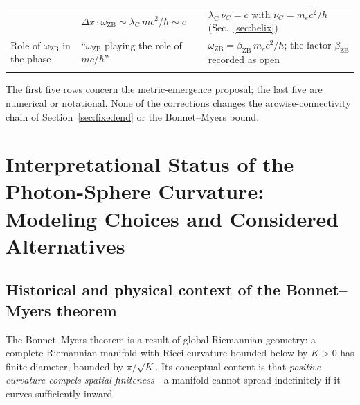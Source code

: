 \documentclass[%
 reprint, amsmath,amssymb, aps, prb, ]{revtex4-2}
\numberwithin{equation}{section}
\newcommand{\omZB}{\omega_{\text{ZB}}}
\newcommand{\lambdaC}{\lambda_{\mathrm{C}}}
\begin{document}
\begin{table}[t!]
\begin{tabular}{p{4.6cm}p{5.4cm}p{5.5cm}}
& $\Delta x\cdot\omZB \sim \lambdaC\,mc^2/\hbar \sim c$
& $\lambdaC\,\nu_C = c$ with $\nu_C = m_ec^2/h$ (Sec.~\ref{sec:helix}) \\
\addlinespace[0.3cm]
Role of $\omZB$ in the phase
& ``$\omZB$ playing the role of $mc/\hbar$''
& $\omZB = \beta_{\mathrm{ZB}}\,m_ec^2/\hbar$; the factor $\beta_{\mathrm{ZB}}$ recorded as open \\
\addlinespace[0.2cm]
\bottomrule
\end{tabular}
\vspace{0.2cm}
\begin{minipage}{0.95\textwidth}
\justifying\footnotesize
The first five rows concern the metric-emergence proposal; the last five are numerical or notational. None of the corrections changes the arcwise-connectivity chain of Section~\ref{sec:fixedend} or the Bonnet--Myers bound.
\end{minipage}
\end{table}

\section{Interpretational Status of the Photon-Sphere Curvature: Modeling Choices and Considered Alternatives}
\label{app:curvature_interpretation}

\subsection{Historical and physical context of the Bonnet--Myers theorem}
\label{app:bonnet_history}

The Bonnet--Myers theorem is a result of global Riemannian geometry: a complete Riemannian manifold with Ricci curvature bounded below by $K>0$ has finite diameter, bounded by $\pi/\sqrt{K}$. Its conceptual content is that \emph{positive curvature compels spatial finiteness}---a manifold cannot spread indefinitely if it curves sufficiently inward.
\end{document}
